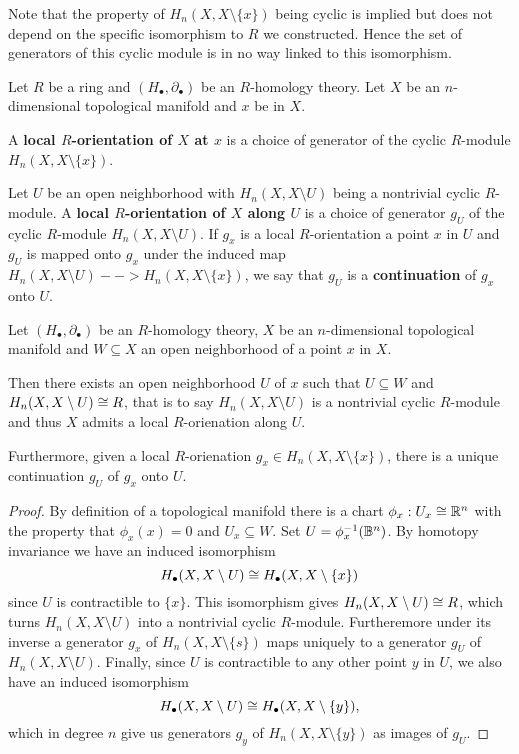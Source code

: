 	\begin{remark}
		Note that the property of $H_n(X,X\setminus \{x\})$ being cyclic is implied but does not depend on the specific isomorphism to $R$ we constructed. Hence the set of generators of this cyclic module is in no way linked to this isomorphism.
	\end{remark}

	\begin{definition}
		Let $R$ be a ring and $(H_\bullet, \partial_\bullet)$ be an $R$-homology theory. Let $X$ be an $n$-dimensional topological manifold and $x$ be in $X$. 

		A \textbf{local $R$-orientation of $X$ at $x$} is a choice of generator of the cyclic $R$-module $H_n(X,X\setminus\{x\})$.

		Let $U$ be an open neighborhood with $H_n(X,X\setminus U)$ being a nontrivial cyclic $R$-module. A \textbf{local $R$-orientation of $X$ along $U$} is a choice of generator $g_U$ of the cyclic $R$-module $H_n(X,X\setminus U)$. If $g_x$ is a local $R$-orientation a point $x$ in $U$ and $g_U$ is mapped onto $g_x$ under the induced map $H_n(X,X\setminus U) --> H_n(X,X\setminus \{x\})$, we say that $g_U$ is a \textbf{continuation} of $g_x$ onto $U$.
	\end{definition}

	\begin{lemma}
		Let $(H_\bullet, \partial_\bullet)$ be an $R$-homology theory, $X$ be an $n$-dimensional topological manifold and $W \subseteq X$ an open neighborhood of a point $x$ in $X$.

		Then there exists an open neighborhood $U$ of $x$ such that $U \subseteq W$ and $H_n(X,X\setminus U) \cong R$, that is to say $H_n(X,X\setminus U)$ is a nontrivial cyclic $R$-module and thus $X$ admits a local $R$-orienation along $U$.

		Furthermore, given a local $R$-orienation $g_x \in H_n(X,X\setminus\{x\})$, there is a unique continuation $g_U$ of $g_x$ onto $U$.
	\end{lemma}
	\begin{proof}
		By definition of a topological manifold there is a chart $\phi_x: U_x \cong \mathbb{R}^n$ with the property that $\phi_x(x)=0$ and $U_x \subseteq W$. Set $U = \phi_x^{-1}(\mathbb{B}^n)$. By homotopy invariance we have an induced isomorphism
		\begin{equation*}
			H_\bullet(X,X\setminus U) \cong H_\bullet(X,X\setminus\{x\})
		\end{equation*}
		since $U$ is contractible to $\{x\}$. This isomorphism gives $H_n(X,X\setminus U) \cong R$, which turns $H_n(X,X\setminus U)$ into a nontrivial cyclic $R$-module. Furtheremore under its inverse a generator $g_x$ of $H_n(X,X\setminus\{s\})$ maps uniquely to a generator $g_U$ of $H_n(X,X\setminus U)$. Finally, since $U$ is contractible to any other point $y$ in $U$, we also have an induced isomorphism
		\begin{equation*}
			H_\bullet(X,X\setminus U) \cong H_\bullet(X,X\setminus \{y\}),
		\end{equation*}
		which in degree $n$ give us generators $g_y$ of $H_n(X,X\setminus \{y\})$ as images of $g_U$.
	\end{proof}

